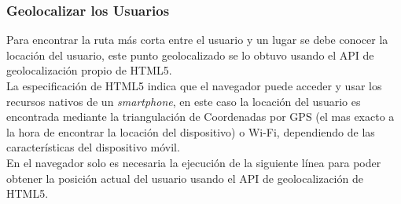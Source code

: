 

%
%
%



\subsubsection{Geolocalizar los Usuarios}
\label{sub:Manejo de Usuarios}

Para encontrar la ruta más corta entre el usuario y un lugar se debe conocer la locación del usuario, este punto geolocalizado se lo obtuvo usando el API de geolocalización propio de HTML5. \\

La especificación de HTML5 indica que el navegador puede acceder y usar los recursos nativos de un \emph{smartphone}, en este caso la locación del usuario es encontrada mediante la triangulación de Coordenadas por GPS (el mas exacto a la hora de encontrar la locación del dispositivo) o Wi-Fi, dependiendo de las características del dispositivo móvil. \\

En el navegador solo es necesaria la ejecución de la siguiente línea para poder obtener la posición actual del usuario usando el API de geolocalización de HTML5.

